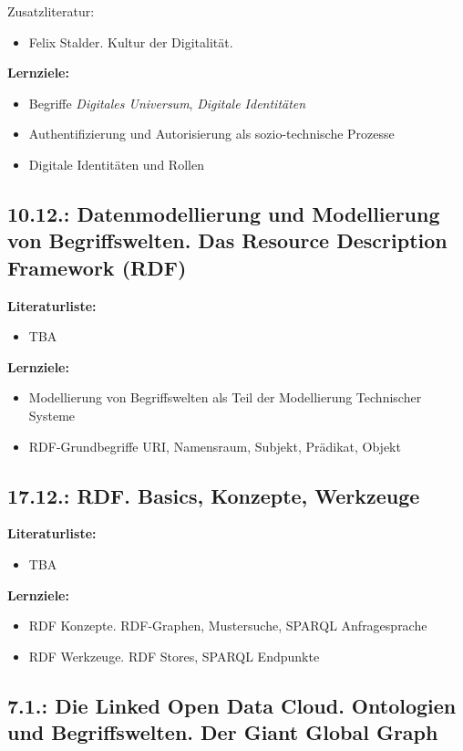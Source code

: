 \documentclass[11pt,a4paper]{article}
\begin{document}
Zusatzliteratur:
\begin{itemize}[noitemsep]
\item Felix Stalder. Kultur der Digitalität.
\end{itemize}

\textbf{Lernziele:}
\begin{itemize}[noitemsep]
\item Begriffe \emph{Digitales Universum}, \emph{Digitale Identitäten}
\item Authentifizierung und Autorisierung als sozio-technische Prozesse
\item Digitale Identitäten und Rollen
\end{itemize}

\subsection{10.12.: Datenmodellierung und Modellierung von Begriffswelten.
  Das Resource Description Framework (RDF)}

\textbf{Literaturliste:}
\begin{itemize}[noitemsep]
\item TBA
\end{itemize}

\textbf{Lernziele:}
\begin{itemize}[noitemsep]
\item Modellierung von Begriffswelten als Teil der Modellierung Technischer
  Systeme
\item RDF-Grundbegriffe URI, Namensraum, Subjekt, Prädikat, Objekt
\end{itemize}

\subsection{17.12.: RDF. Basics, Konzepte, Werkzeuge}

\textbf{Literaturliste:}
\begin{itemize}
\item TBA
\end{itemize}

\textbf{Lernziele:}
\begin{itemize}[noitemsep]
\item RDF Konzepte. RDF-Graphen, Mustersuche, SPARQL Anfragesprache
\item RDF Werkzeuge. RDF Stores, SPARQL Endpunkte
\end{itemize}

\subsection{7.1.: Die Linked Open Data Cloud. Ontologien und Begriffswelten.
Der Giant Global Graph}
\end{document}
